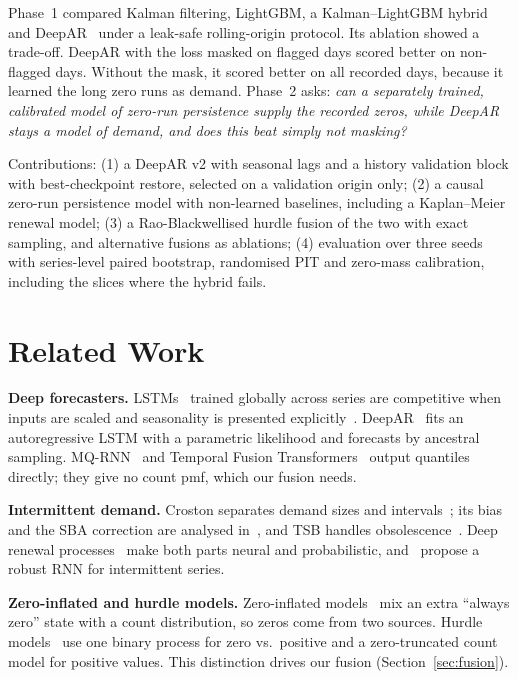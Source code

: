 \documentclass[conference]{IEEEtran}
\begin{document}
Phase~1 compared Kalman filtering, LightGBM, a Kalman--LightGBM hybrid and DeepAR~\cite{salinas2020} under a leak-safe rolling-origin protocol. Its ablation showed a trade-off. DeepAR with the loss masked on flagged days scored better on non-flagged days. Without the mask, it scored better on all recorded days, because it learned the long zero runs as demand. Phase~2 asks: \emph{can a separately trained, calibrated model of zero-run persistence supply the recorded zeros, while DeepAR stays a model of demand, and does this beat simply not masking?}

Contributions: (1) a DeepAR v2 with seasonal lags and a history validation block with best-checkpoint restore, selected on a validation origin only; (2) a causal zero-run persistence model with non-learned baselines, including a Kaplan--Meier renewal model; (3) a Rao-Blackwellised hurdle fusion of the two with exact sampling, and alternative fusions as ablations; (4) evaluation over three seeds with series-level paired bootstrap, randomised PIT and zero-mass calibration, including the slices where the hybrid fails.

\section{Related Work}
\textbf{Deep forecasters.} LSTMs~\cite{hochreiter1997} trained globally across series are competitive when inputs are scaled and seasonality is presented explicitly~\cite{hewamalage2021,bandara2020}. DeepAR~\cite{salinas2020} fits an autoregressive LSTM with a parametric likelihood and forecasts by ancestral sampling. MQ-RNN~\cite{wen2017mqrnn} and Temporal Fusion Transformers~\cite{lim2021} output quantiles directly; they give no count pmf, which our fusion needs.

\textbf{Intermittent demand.} Croston separates demand sizes and intervals~\cite{croston1972}; its bias and the SBA correction are analysed in~\cite{syntetos2005accuracy}, and TSB handles obsolescence~\cite{teunter2011}. Deep renewal processes~\cite{turkmen2021} make both parts neural and probabilistic, and~\cite{jeon2022} propose a robust RNN for intermittent series.

\textbf{Zero-inflated and hurdle models.} Zero-inflated models~\cite{lambert1992} mix an extra ``always zero'' state with a count distribution, so zeros come from two sources. Hurdle models~\cite{mullahy1986} use one binary process for zero vs.\ positive and a zero-truncated count model for positive values. This distinction drives our fusion (Section~\ref{sec:fusion}).
\end{document}
